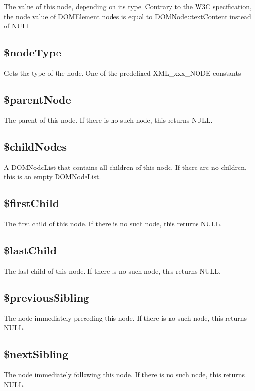The value of this node, depending on its type. Contrary to the W3C specification, the node value of DOMElement nodes is equal to DOMNode::textContent instead of NULL.

\subsection{\$nodeType}

Gets the type of the node. One of the predefined XML\_xxx\_NODE constants

\subsection{\$parentNode}

The parent of this node. If there is no such node, this returns NULL.

\subsection{\$childNodes}

A DOMNodeList that contains all children of this node. If there are no children, this is an empty DOMNodeList.

\subsection{\$firstChild}

The first child of this node. If there is no such node, this returns NULL.

\subsection{\$lastChild}

The last child of this node. If there is no such node, this returns NULL.

\subsection{\$previousSibling}

The node immediately preceding this node. If there is no such node, this returns NULL.

\subsection{\$nextSibling}

The node immediately following this node. If there is no such node, this returns NULL.

